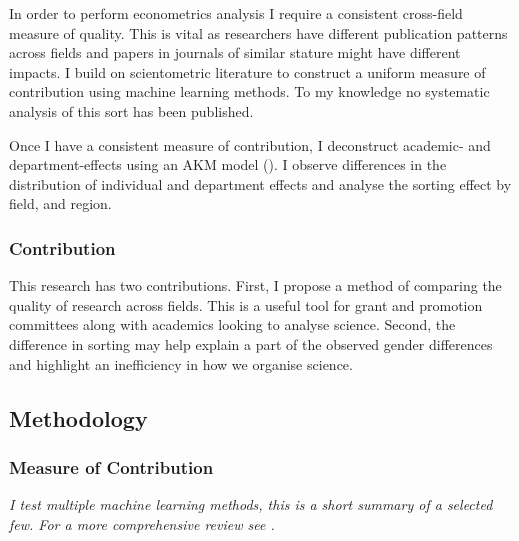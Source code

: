 \documentclass[10pt]{report}
\begin{document}

In order to perform econometrics analysis I require a consistent cross-field measure of quality. This is vital as researchers have different publication patterns across fields and papers in journals of similar stature might have different impacts. I build on scientometric literature to construct a uniform measure of contribution using machine learning methods. To my knowledge no systematic analysis of this sort has been published.

Once I have a consistent measure of contribution, I deconstruct academic- and department-effects using an AKM model (\cite{Abowd1999}). I observe differences in the distribution of individual and department effects and analyse the sorting effect by field, and region.

\subsubsection*{Contribution}

This research has two contributions. First, I propose a method of comparing the quality of research across fields. This is a useful tool for grant and promotion committees along with academics looking to analyse science.
Second, the difference in sorting may help explain a part of the observed gender differences and highlight an inefficiency in how we organise science.


\subsection*{Methodology}
\label{sec:method}


\subsubsection*{Measure of Contribution}
\label{ssec:contrib}

\vspace{5pt}

\textit{I test multiple machine learning methods, this is a short summary of a selected few. For a more comprehensive review see \textcite[Chapter 19]{Kuhn2013}.}

\vspace{10pt}
\end{document}
